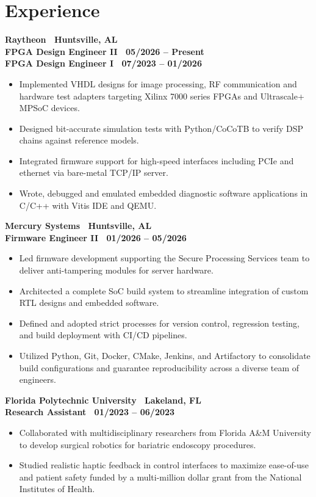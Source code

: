 \section{Experience}

\textbf{Raytheon \textbar\ Huntsville, AL} \\
{\small\textbf{FPGA Design Engineer II \textbar\ 05/2026 -- Present}} \\
{\small\textbf{FPGA Design Engineer I \textbar\ 07/2023 -- 01/2026}}

\begin{itemize}
  \item Implemented VHDL designs for image processing, RF communication and hardware test adapters targeting Xilinx 7000 series FPGAs and Ultrascale+ MPSoC devices.
  \item Designed bit-accurate simulation tests with Python/CoCoTB to verify DSP chains against reference models.
  \item Integrated firmware support for high-speed interfaces including PCIe and ethernet via bare-metal TCP/IP server.
  \item Wrote, debugged and emulated embedded diagnostic software applications in C/C++ with Vitis IDE and QEMU.
\end{itemize}

\textbf{Mercury Systems \textbar\ Huntsville, AL} \\
{\small\textbf{Firmware Engineer II \textbar\ 01/2026 -- 05/2026}}

\begin{itemize}
  \item Led firmware development supporting the Secure Processing Services team to deliver anti-tampering modules for server hardware.
  \item Architected a complete SoC build system to streamline integration of custom RTL designs and embedded software.
  \item Defined and adopted strict processes for version control, regression testing, and build deployment with CI/CD pipelines.
  \item Utilized Python, Git, Docker, CMake, Jenkins, and Artifactory to consolidate build configurations and guarantee reproducibility across a diverse team of engineers.
\end{itemize}

\textbf{Florida Polytechnic University \textbar\ Lakeland, FL} \\
{\small\textbf{Research Assistant \textbar\ 01/2023 -- 06/2023}}

\begin{itemize}
  \item Collaborated with multidisciplinary researchers from Florida A\&M University to develop surgical robotics for bariatric endoscopy procedures.
  \item Studied realistic haptic feedback in control interfaces to maximize ease-of-use and patient safety funded by a multi-million dollar grant from the National Institutes of Health.
\end{itemize}
